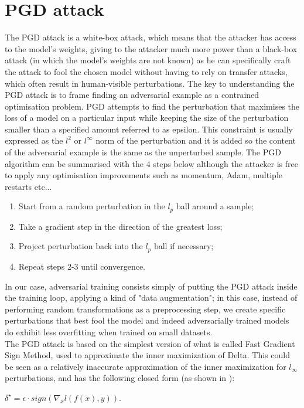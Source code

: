 \documentclass{article}
\begin{document}
\section{PGD attack}
The PGD attack is a white-box attack, which means that the attacker has access to the model's weights, giving to the attacker much more power than a black-box attack (in which the model's weights are not known) as he can specifically craft the attack to fool the chosen model without having to rely on transfer attacks, which often result in human-visible perturbations.
The key to understanding the PGD attack is to frame finding an adversarial example as a contrained optimisation problem. PGD attempts to find the perturbation that maximises the loss of a model on a particular input while keeping the size of the perturbation smaller than a specified amount referred to as epsilon. This constraint is usually expressed as the $l^2$ or $l^{\infty}$ norm of the perturbation and it is added so the content of the adversarial example is the same as the unperturbed sample.
The PGD algorithm can be summarised with the 4 steps below although the attacker is free to apply any optimisation improvements such as momentum, Adam, multiple restarts etc...
\begin{enumerate}
	\item Start from a random perturbation in the $l_p$ ball around a sample;
	\item Take a gradient step in the direction of the greatest loss;
	\item Project perturbation back into the $l_p$ ball if necessary;
	\item Repeat steps 2-3 until convergence.
\end{enumerate}
In our case, adversarial training consists simply of putting the PGD attack inside the training loop, applying a kind of "data augmentation"; in this case, instead of performing random transformations as a preprocessing step, we create specific perturbations that best fool the model and indeed adversarially trained models do exhibit less overfitting when trained on small datasets.\\
The PGD attack is based on the simplest version of what is called Fast Gradient Sign Method, used to approximate the inner maximization of Delta. This could be seen as a relatively inaccurate approximation of the inner maximization for $l_{\infty}$ perturbations, and has the following closed form (as shown in \cite{GoodfellowEtAl2014}):
\begin{center}
	$\delta^{\star} = \epsilon \cdot sign(\nabla_{x}l(f(x), y))$.
\end{center}
\end{document}
